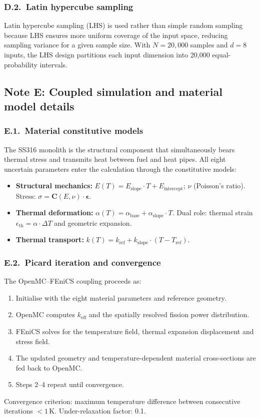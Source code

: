 \documentclass[11pt,a4paper]{article}
\newcommand{\keff}{\ensuremath{k_{\mathrm{eff}}}}
\newcommand{\Eint}{\ensuremath{E_{\mathrm{intercept}}}}
\newcommand{\Eslope}{\ensuremath{E_{\mathrm{slope}}}}
\newcommand{\abase}{\ensuremath{\alpha_{\mathrm{base}}}}
\newcommand{\aslope}{\ensuremath{\alpha_{\mathrm{slope}}}}
\newcommand{\kref}{\ensuremath{k_{\mathrm{ref}}}}
\newcommand{\Tref}{\ensuremath{T_{\mathrm{ref}}}}
\newcommand{\kslope}{\ensuremath{k_{\mathrm{slope}}}}
\begin{document}
\subsubsection*{D.2.~Latin hypercube sampling}

Latin hypercube sampling (LHS) is used rather than simple random
sampling because LHS ensures more uniform coverage of the input space,
reducing sampling variance for a given sample size. With $N = 20{,}000$
samples and $d = 8$ inputs, the LHS design partitions each input
dimension into 20,000 equal-probability intervals.


\subsection{Note E: Coupled simulation and material model details}

\subsubsection*{E.1.~Material constitutive models}

The SS316 monolith is the structural component that simultaneously
bears thermal stress and transmits heat between fuel and heat pipes.
All eight uncertain parameters enter the calculation through the
constitutive models:
\begin{itemize}
\item \textbf{Structural mechanics:}
  $E(T) = \Eslope{} \cdot T + \Eint{}$; $\nu$ (Poisson's ratio).
  Stress: $\sigma = \mathbf{C}(E, \nu) \cdot \boldsymbol{\epsilon}$.
\item \textbf{Thermal deformation:}
  $\alpha(T) = \abase{} + \aslope{} \cdot T$.
  Dual role: thermal strain
  $\epsilon_\mathrm{th} = \alpha \cdot \Delta T$ and geometric
  expansion.
\item \textbf{Thermal transport:}
  $k(T) = \kref{} + \kslope{} \cdot (T - \Tref{})$.
\end{itemize}

\subsubsection*{E.2.~Picard iteration and convergence}

The OpenMC--FEniCS coupling proceeds as:
\begin{enumerate}
\item Initialise with the eight material parameters and reference
  geometry.
\item OpenMC computes \keff{} and the spatially resolved fission power
  distribution.
\item FEniCS solves for the temperature field, thermal expansion
  displacement and stress field.
\item The updated geometry and temperature-dependent material
  cross-sections are fed back to OpenMC.
\item Steps 2--4 repeat until convergence.
\end{enumerate}
Convergence criterion: maximum temperature difference between
consecutive iterations $< 1$\,K. Under-relaxation factor: 0.1.
\end{document}
